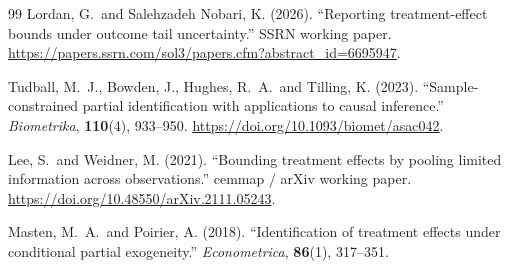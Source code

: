 \documentclass[11pt]{article}
\theoremstyle{definition}
\theoremstyle{plain}
\theoremstyle{remark}
\begin{document}
\begin{thebibliography}{99}
Lordan, G.\ and Salehzadeh Nobari, K. (2026).
``Reporting treatment-effect bounds under outcome tail uncertainty.''
SSRN working paper.
\url{https://papers.ssrn.com/sol3/papers.cfm?abstract_id=6695947}.

Tudball, M.~J., Bowden, J., Hughes, R.~A.\ and Tilling, K. (2023).
``Sample-constrained partial identification with applications to causal
inference.''
\emph{Biometrika}, \textbf{110}(4), 933--950.
\url{https://doi.org/10.1093/biomet/asac042}.

Lee, S.\ and Weidner, M. (2021).
``Bounding treatment effects by pooling limited information across observations.''
cemmap / arXiv working paper.
\url{https://doi.org/10.48550/arXiv.2111.05243}.

Masten, M.~A.\ and Poirier, A. (2018).
``Identification of treatment effects under conditional partial exogeneity.''
\emph{Econometrica}, \textbf{86}(1), 317--351.

\end{thebibliography}
\end{document}
